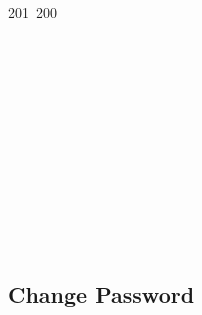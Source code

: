 201~200~\documentclass{article}
\begin{document}
	                                                                                                \begin{lstlisting}[language=Python, caption=Login]

	                                                                                                def login_client():
	                                                                                                    """
	                                                                                                        \brief Log in a client by verifying username and password, and retrieving user data from the server.
	                                                                                                            \return A tuple containing the user object and the user key.
	                                                                                                                """
	                                                                                                                    username = get_input("Enter your username")
	                                                                                                                        password = get_input("Enter your password")

	                                                                                                                            user_key = crypto.derive_user_key_from_password(username, password)
	                                                                                                                                hashed_user_key = crypto.hash_user_key(user_key)

	                                                                                                                                    user = server.login(username, hashed_user_key) # Sever authentification through TLS
	                                                                                                                                        return user, user_key

	                                                                                                                                        \end{lstlisting}
	                                                                                                                                        \subsection{Change Password}
\end{document}
